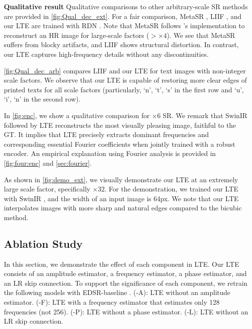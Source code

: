 \documentclass[10pt,twocolumn,letterpaper]{article}
\begin{document}
\textbf{Qualitative result} Qualitative comparisons to other arbitrary-scale SR methods are provided in \cref{fig:Qual_dec_ext}. For a fair comparison, MetaSR \cite{hu2019meta}, LIIF \cite{chen2021learning}, and our LTE are trained with RDN \cite{zhang2018residual}. Note that MetaSR \cite{hu2019meta} follows \cite{chen2021learning}'s implementation to reconstruct an HR image for large-scale factors ($>\times4$). We see that MetaSR suffers from blocky artifacts, and LIIF shows structural distortion. In contrast, our LTE captures high-frequency details without any discontinuities.

\cref{fig:Qual_dec_arb} compares LIIF \cite{chen2021learning} and our LTE for text images with non-integer scale factors. We observe that our LTE is capable of restoring more clear edges of printed texts for all scale factors (particularly, `n', `t', `s' in the first row and `u', `i', `n' in the second row).

In \cref{fig:enc}, we show a qualitative comparison for $\times6$ SR. We remark that SwinIR \cite{liang2021swinir} followed by LTE reconstructs the most visually pleasing image, faithful to the GT. It implies that LTE precisely extracts dominant frequencies and corresponding essential Fourier coefficients when jointly trained with a robust encoder. An empirical explanation using Fourier analysis is provided in \cref{fig:four:enc} and \cref{sec:fourier}.

As shown in \cref{fig:demo_ext}, we visually demonstrate our LTE at an extremely large scale factor, specifically $\times32$. For the demonstration, we trained our LTE with SwinIR \cite{liang2021swinir}, and the width of an input image is 64px. We note that our LTE interpolates images with more sharp and natural edges compared to the bicubic method.


\subsection{Ablation Study}
\label{sec:abl}
In this section, we demonstrate the effect of each component in LTE. Our LTE consists of an amplitude estimator, a frequency estimator, a phase estimator, and an LR skip connection. To support the significance of each component, we retrain the following models with EDSR-baseline \cite{Lim_2017_CVPR_Workshops}. (-A): LTE without an amplitude estimator. (-F): LTE with a frequency estimator that estimates only 128 frequencies (not 256). (-P): LTE without a phase estimator. (-L): LTE without an LR skip connection.
\end{document}
